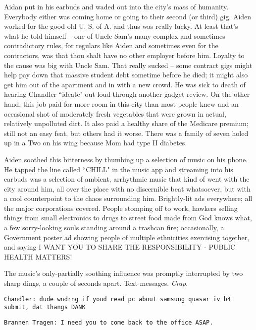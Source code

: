 \documentclass[11pt]{book}
\begin{document}
	Aidan put in his earbuds and waded out into the city's mass of humanity. Everybody either was coming home or going to their second (or third) gig. Aiden worked for the good old U. S. of A. and thus was really lucky. At least that’s what he told himself -- one of Uncle Sam’s many complex and sometimes contradictory rules, for regulars like Aiden and sometimes even for the contractors, was that thou shalt have no other employer before him. Loyalty to the cause was big with Uncle Sam. That really sucked -- some contract gigs might help pay down that massive student debt sometime before he died; it might also get him out of the apartment and in with a new crowd. He was sick to death of hearing Chandler ``ideate" out loud through another gadget review. On the other hand, this job paid for more room in this city than most people knew and an occasional shot of moderately fresh vegetables that were grown in actual, relatively unpolluted dirt. It also paid a healthy share of the Medicare premium; still not an easy feat, but others had it worse. There was a family of seven holed up in a Two on his wing because Mom had type II diabetes.
	
	Aiden soothed this bitterness by thumbing up a selection of music on his phone. He tapped the line called ``CHILL" in the music app and streaming into his earbuds was a selection of ambient, arrhythmic music that kind of went with the city around him, all over the place with no discernible beat whatsoever, but with a cool counterpoint to the chaos surrounding him. Brightly-lit ads everywhere; all the major corporations covered. People stomping off to work, hawkers selling things from small electronics to drugs to street food made from God knows what, a few sorry-looking souls standing around a trashcan fire; occasionally, a Government poster ad showing people of multiple ethnicities exercising together, and saying I WANT YOU TO SHARE THE RESPONSIBILITY - PUBLIC HEALTH MATTERS! 
	
	The music's only-partially soothing influence was promptly interrupted by two sharp dings, a couple of seconds apart. Text messages. \textit{Crap}.
	
	\vspace{0.5cm}
	
	\texttt{Chandler: dude wndrng if youd read pc about samsung quasar iv b4 submit, dat thangs DANK} 
	
	\texttt{Brannen Tragen: I need you to come back to the office ASAP.}
	
	\vspace{0.5cm}
	
\end{document}
